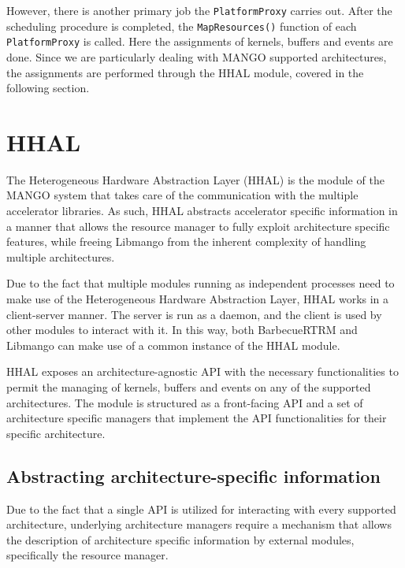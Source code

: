 However, there is another primary job the \texttt{PlatformProxy} carries out. After the scheduling procedure is completed, the \texttt{MapResources()} function of each \texttt{PlatformProxy} is called. Here the assignments of kernels, buffers and events are done. Since we are particularly dealing with MANGO supported architectures, the assignments are performed through the HHAL module, covered in the following section.

\section{HHAL} \label{HHAL}


The Heterogeneous Hardware Abstraction Layer (HHAL) is the module of the MANGO system that takes care of the communication with the multiple accelerator libraries.
As such, HHAL abstracts accelerator specific information in a manner that allows the resource manager to fully exploit architecture specific features, while freeing Libmango from the inherent complexity of handling multiple architectures.

Due to the fact that multiple modules running as independent processes need to make use of the Heterogeneous Hardware Abstraction Layer, HHAL works in a client-server manner. The server is run as a daemon, and the client is used by other modules to interact with it. In this way, both BarbecueRTRM and Libmango can make use of a common instance of the HHAL module.

HHAL exposes an architecture-agnostic API with the necessary functionalities to permit the managing of kernels, buffers and events on any of the supported architectures. The module is structured as a front-facing API and a set of architecture specific managers that implement the API functionalities for their specific architecture.

\subsection{Abstracting architecture-specific information}

Due to the fact that a single API is utilized for interacting with every supported architecture, underlying architecture managers require a mechanism that allows the description of architecture specific information by external modules, specifically the resource manager.

